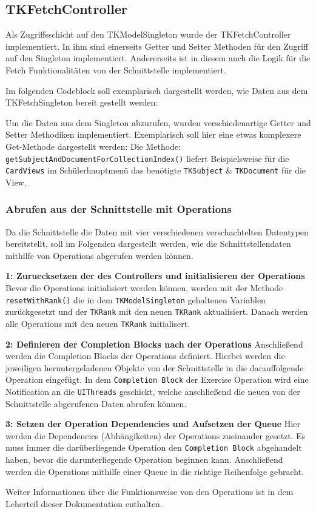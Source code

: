 \subsection{TKFetchController}
Als Zugriffsschicht auf den TKModelSingleton wurde der TKFetchController implementiert. In ihm sind einerseits Getter und Setter Methoden für den Zugriff auf den Singleton implementiert. Andererseits ist in diesem auch die Logik für die Fetch Funktionalitäten von der Schnittstelle implementiert.

Im folgenden Codeblock soll exemplarisch dargestellt werden, wie Daten aus dem TKFetchSingleton bereit gestellt werden:

Um die Daten aus dem Singleton abzurufen, wurden verschiedenartige Getter und Setter Methodiken implementiert. Exemplarisch soll hier eine etwas komplexere Get-Methode dargestellt werden:
Die Methode: \texttt{getSubjectAndDocumentForCollectionIndex()} liefert Beispielsweise für die \texttt{CardViews} im Schülerhauptmenü das benötigte \texttt{TKSubject} \& \texttt{TKDocument} für die View.

\subsubsection{Abrufen aus der Schnittstelle mit Operations}
Da die Schnittstelle die Daten mit vier verschiedenen verschachtelten Datentypen bereitstellt, soll im Folgenden dargestellt werden, wie die Schnittstellendaten mithilfe von Operations abgerufen werden können.


\textbf{1: Zuruecksetzen der des Controllers und initialisieren der Operations}
Bevor die Operations initialisiert werden können, werden mit der Methode \texttt{resetWithRank()} die in dem \texttt{TKModelSingleton} gehaltenen Variablen zurückgesetzt und der \texttt{TKRank} mit den neuen \texttt{TKRank} aktualisiert. Danach werden alle Operations mit den neuen \texttt{TKRank} initialisert.

\textbf{2: Definieren der Completion Blocks nach der Operations}
Anschließend werden die Completion Blocks der Operations definiert. Hierbei werden die jeweiligen heruntergeladenen Objekte von der Schnittstelle in die darauffolgende Operation eingefügt. In dem \texttt{Completion Block} der Exercise Operation wird eine Notification an die \texttt{UIThreads} geschickt, welche anschließend die neuen von der Schnittstelle abgerufenen Daten abrufen können.

\textbf{3: Setzen der Operation Dependencies und Aufsetzen der Queue}
Hier werden die Dependencies (Abhängikeiten) der Operations zueinander gesetzt. Es muss immer die darüberliegende Operation den \texttt{Completion Block} abgehandelt haben, bevor die darunterliegende Operation beginnen kann. Anschließend werden die Operations mithilfe einer Queue in die richtige Reihenfolge gebracht.

Weiter Informationen über die Funktionsweise von den Operations ist in dem Leherteil dieser Dokumentation enthalten. %